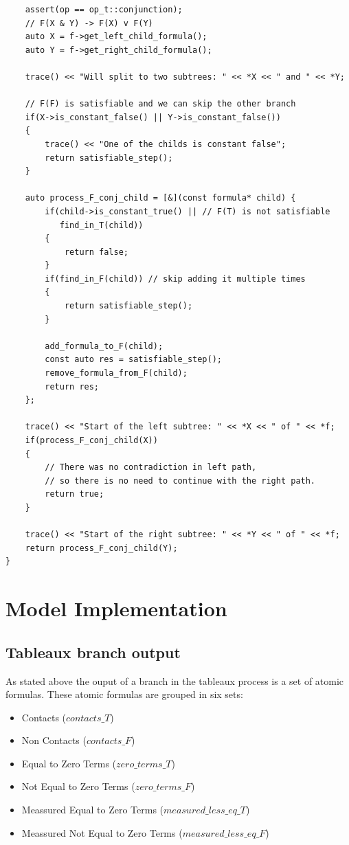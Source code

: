 \documentclass{article}
\begin{document}
\begin{lstlisting}
    assert(op == op_t::conjunction);
    // F(X & Y) -> F(X) v F(Y)
    auto X = f->get_left_child_formula();
    auto Y = f->get_right_child_formula();

    trace() << "Will split to two subtrees: " << *X << " and " << *Y;

    // F(F) is satisfiable and we can skip the other branch
    if(X->is_constant_false() || Y->is_constant_false())
    {
        trace() << "One of the childs is constant false";
        return satisfiable_step();
    }

    auto process_F_conj_child = [&](const formula* child) {
        if(child->is_constant_true() || // F(T) is not satisfiable
           find_in_T(child))
        {
            return false;
        }
        if(find_in_F(child)) // skip adding it multiple times
        {
            return satisfiable_step();
        }

        add_formula_to_F(child);
        const auto res = satisfiable_step();
        remove_formula_from_F(child);
        return res;
    };

    trace() << "Start of the left subtree: " << *X << " of " << *f;
    if(process_F_conj_child(X))
    {
        // There was no contradiction in left path,
        // so there is no need to continue with the right path.
        return true;
    }

    trace() << "Start of the right subtree: " << *Y << " of " << *f;
    return process_F_conj_child(Y);
}
\end{lstlisting}

	\newpage
	\section{Model Implementation}

	\subsection*{Tableaux branch output}
	\label{tableaux:branch:output}
	As stated above the ouput of a branch in the tableaux process is a set of atomic formulas. These atomic formulas are grouped in six sets:
	\begin{itemize}
		\item Contacts ($contacts\_T$)
		\item Non Contacts ($contacts\_F$)
		\item Equal to Zero Terms ($zero\_terms\_T$)
		\item Not Equal to Zero Terms ($zero\_terms\_F$)
		\item Meassured Equal to Zero Terms ($measured\_less\_eq\_T$)
		\item Meassured Not Equal to Zero Terms ($measured\_less\_eq\_F$)
	\end{itemize}
\end{document}
